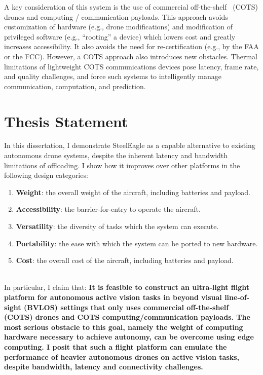 A key consideration of this system is the use of commercial off-the-shelf~\cite{FAR} (COTS) drones and computing / communication payloads. This approach avoids customization of hardware (e.g., drone modifications) and modification of privileged software (e.g., “rooting” a device) which lowers cost and greatly increases accessibility. It also avoids the need for re-certification (e.g., by the FAA or the FCC). However, a COTS approach also introduces new obstacles. Thermal limitations of lightweight COTS communications devices pose latency, frame rate, and quality challenges, and force such systems to intelligently manage communication, computation, and prediction.

\section{Thesis Statement}
In this dissertation, I demonstrate SteelEagle as a capable alternative to existing autonomous drone systems, despite the inherent latency and bandwidth limitations of offloading. I show how it improves over other platforms in the following design categories:

\begin{enumerate}
\item \textbf{Weight}: the overall weight of the aircraft, including batteries and payload.
\item \textbf{Accessibility}: the barrier-for-entry to operate the aircraft. 
\item \textbf{Versatility}: the diversity of tasks which the system can execute.
\item \textbf{Portability}: the ease with which the system can be ported to new hardware.
\item \textbf{Cost}: the overall cost of the aircraft, including batteries and payload.
\end{enumerate}
\\
In particular, I claim that:
\newpage
\textbf{It is feasible to construct an ultra-light flight platform for autonomous active vision tasks in beyond visual line-of-sight (BVLOS) settings that only uses commercial off-the-shelf (COTS) drones and COTS computing/communication payloads. The most serious obstacle to this goal, namely the weight of computing hardware necessary to achieve autonomy, can be overcome using edge computing. I posit that such a flight platform can emulate the performance of heavier autonomous drones on active vision tasks, despite bandwidth, latency and connectivity challenges.}

